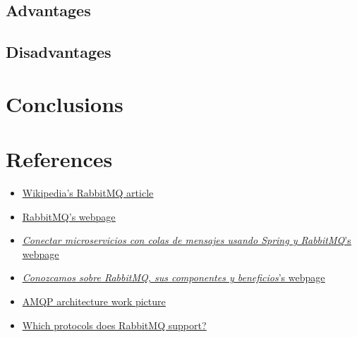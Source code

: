 \documentclass[4paper,12pt]{article}
\begin{document}
\newpage

\subsection*{Advantages}
\justify{}

\subsection*{Disadvantages}
\justify{}

\section*{Conclusions}
\justify{}

\section*{References}
\begin{itemize}
    \item \href{https://en.wikipedia.org/wiki/RabbitMQ}{\underline{Wikipedia's RabbitMQ article}}
    \item \href{https://www.rabbitmq.com}{\underline{RabbitMQ's webpage}}
    \item \href{https://www.sdos.es/blog/microservicios-mensajes-spring-rabbitmq}{\underline{\textit{Conectar microservicios con colas de mensajes usando Spring y RabbitMQ}'s webpage}}
    \item \href{https://www.pragma.com.co/academia/lecciones/conozcamos-sobre-rabbitmq-sus-componentes-y-beneficios}{\underline{\textit{Conozcamos sobre RabbitMQ, sus componentes y beneficios}'s webpage}}
    \item \href{https://www.researchgate.net/publication/325119432/figure/fig5/AS:626093459505153@1526283721309/AMQP-architecture-34.png}{\underline{AMQP architecture work picture}}
    \item \href{https://www.rabbitmq.com/protocols.html}{\underline{Which protocols does RabbitMQ support?}}
\end{itemize}
\end{document}
